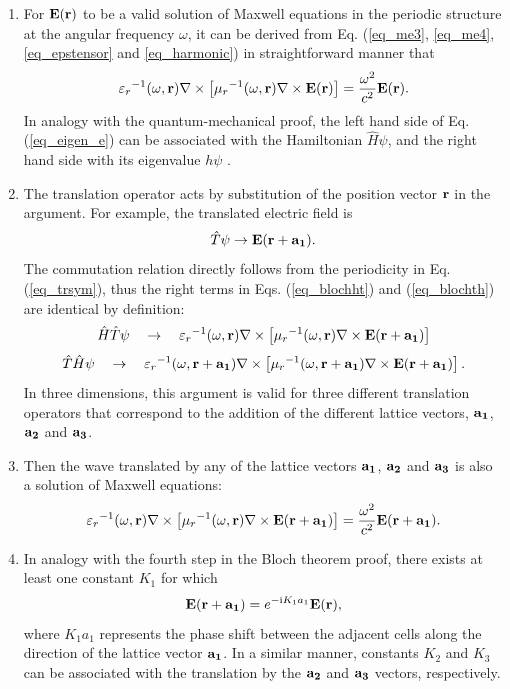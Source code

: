 \begin{enumerate}
\item{
For $\mathbf{E}({\mathbf{r}})$ to be a  valid solution of Maxwell equations in the periodic structure at the angular frequency $\omega$,
it can be derived from Eq. (\ref{eq_me3}, \ref{eq_me4}, \ref{eq_epstensor} and \ref{eq_harmonic}) in straightforward manner that
\begin{equation} 
{\varepsilon_r}^{-1}(\omega,{\mathbf{r}}) \nabla\times \left[{\mu_r}^{-1 }(\omega,{\mathbf{r}}) \nabla\times \mathbf{E}({\mathbf{r}}) \right] = \frac{\omega^2}{c^2}\mathbf{E}({\mathbf{r}}).   \label{eq_eigen_e}
\end{equation}
In analogy with the quantum-mechanical proof, the left hand side of Eq. (\ref{eq_eigen_e}) can be associated with the Hamiltonian $\hat H\psi$, and the right hand side with its eigenvalue $h\psi$ \cite{johnson2003introduction}. 
} 
\item{
The translation operator acts by substitution of the position vector ${\mathbf{r}}$ in the argument. For example, the translated electric field is
\begin{equation} \hat T\psi \rightarrow \mathbf{E}({\mathbf{r}}+\mathbf{a_1}). \label{eq_blocht}\end{equation}
The commutation relation directly follows from the periodicity in Eq. (\ref{eq_trsym}), thus the right terms in Eqs. (\ref{eq_blochht}) and (\ref{eq_blochth}) are identical by definition:
\begin{equation} \hat H \hat T \psi \quad  \rightarrow \quad  {\varepsilon_r}^{-1}(\omega,{\mathbf{r}}    ) \nabla\times \left[{\mu_r}^{-1 }(\omega,{\mathbf{r}}    ) \nabla\times \mathbf{E}({\mathbf{r}}+{\mathbf{a_1}})\right]  \label{eq_blochht}\end{equation}
\begin{equation} \hat T \hat H \psi \quad  \rightarrow \quad  {\varepsilon_r}^{-1}(\omega,{\mathbf{r}}+{\mathbf{a_1}}) \nabla\times \left[{\mu_r}^{-1 }(\omega,{\mathbf{r}}+{\mathbf{a_1}}) \nabla\times \mathbf{E}({\mathbf{r}}+{\mathbf{a_1}})\right] .  \label{eq_blochth}\end{equation}
In three dimensions, this argument is valid for three different translation operators that correspond to the addition of the different lattice vectors, ${\mathbf{a_1}}$, ${\mathbf{a_2}}$ and ${\mathbf{a_3}}$.
} 
\item{
Then the wave translated by any of the lattice vectors ${\mathbf{a_1}}$, ${\mathbf{a_2}}$ and ${\mathbf{a_3}}$ is also a solution of Maxwell equations:
\begin{equation}  {\varepsilon_r}^{-1}(\omega,{\mathbf{r}}) \nabla\times \left[{\mu_r}^{-1 }(\omega,{\mathbf{r}}) \nabla\times   \mathbf{E}({\mathbf{r}}+{\mathbf{a_1}})\right] =  \frac{\omega^2}{c^2}\mathbf{E}({\mathbf{r}}+{\mathbf{a_1}}).  \label{eq_blochme}\end{equation}
}
\item{In analogy with the fourth step in the Bloch theorem proof, there exists at least one constant $K_1$ for which
\begin{equation}  \mathbf{E}({\mathbf{r}}+{\mathbf{a_1}}) = e^{-{\mathrm i} K_1 a_1} \mathbf{E}({\mathbf{r}}),  \label{eq_blochtt}\end{equation}
	where $K_1 a_1$ represents the phase shift between the adjacent cells along the direction of the lattice vector ${\mathbf{a_1}}$. In a similar manner, constants $K_2$ and $K_3$ can be associated with the translation by the ${\mathbf{a_2}}$ and ${\mathbf{a_3}}$ vectors, respectively. 
}
 \end{enumerate}
